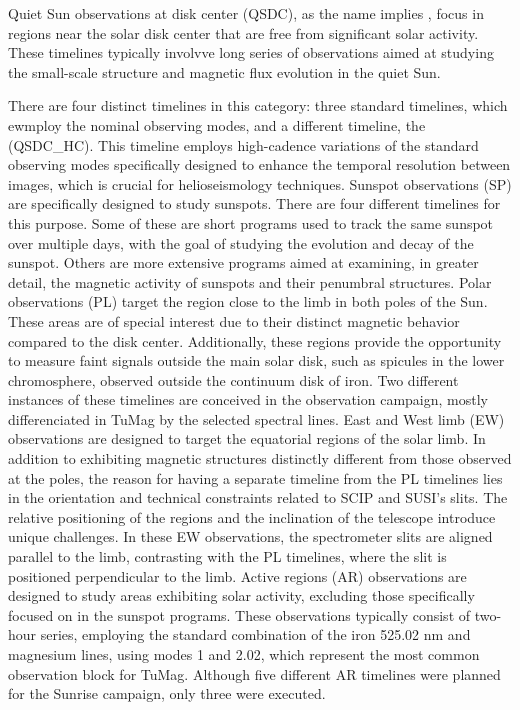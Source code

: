 \begin{itemize}
  \Myitem Quiet Sun observations at disk center (QSDC), as the name implies , focus in regions near the solar disk center that are free from significant solar activity. These timelines typically involvve long series of observations aimed at studying the small-scale structure and magnetic flux evolution in the quiet Sun. 
  
  There are four distinct timelines in this category: three standard timelines, which ewmploy the nominal observing modes, and a different timeline, the (QSDC{\_}HC). This timeline employs high-cadence variations of the standard observing modes specifically designed to enhance the temporal resolution between images, which is crucial for helioseismology techniques.
  \Myitem Sunspot observations (SP) are specifically designed to study sunspots. There are four different timelines for this purpose. Some of these are short programs used to track the same sunspot over multiple days, with the goal of studying the evolution and decay of the sunspot. Others are more extensive programs aimed at examining, in greater detail, the magnetic activity of sunspots and their penumbral structures.
  \Myitem Polar observations (PL) target the region close to the limb in both poles of the Sun. These areas are of special interest due to their distinct magnetic behavior compared to the disk center. Additionally, these regions provide the opportunity to measure faint signals outside the main solar disk, such as spicules in the lower chromosphere, observed outside the continuum disk of iron. Two different instances of these timelines are conceived in the observation campaign, mostly differenciated in TuMag by the selected spectral lines.
  \Myitem East and West limb (EW) observations are designed to target the equatorial regions of the solar limb. In addition to exhibiting magnetic structures distinctly different from those observed at the poles, the reason for having a separate timeline from the PL timelines lies in the orientation and technical constraints related to SCIP and SUSI's slits. The relative positioning of the regions and the inclination of the telescope introduce unique challenges. In these EW observations, the spectrometer slits are aligned parallel to the limb, contrasting with the PL timelines, where the slit is positioned perpendicular to the limb.
  \Myitem Active regions (AR) observations are designed to study areas exhibiting solar activity, excluding those specifically focused on in the sunspot programs. These observations typically consist of two-hour series, employing the standard combination of the iron 525.02 nm and magnesium lines, using modes 1 and 2.02, which represent the most common observation block for TuMag. Although five different AR timelines were planned for the Sunrise campaign, only three were executed.

\end{itemize}
